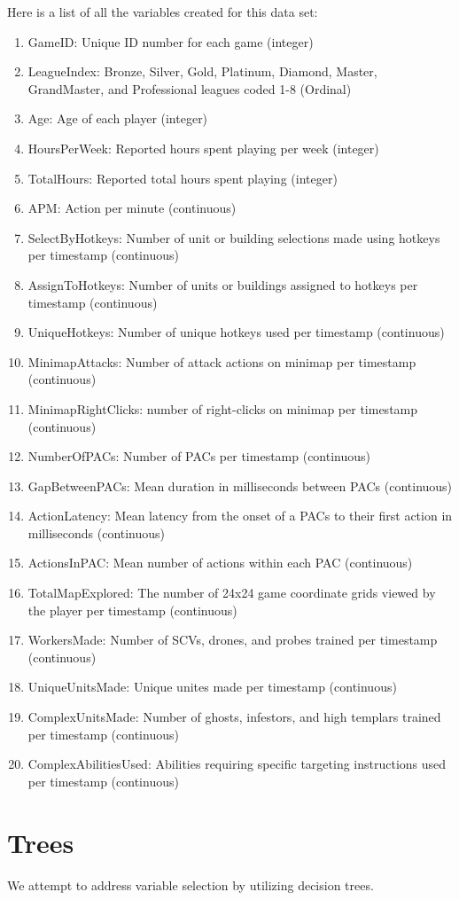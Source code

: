 \documentclass[letterpaper,10pt,english]{/usr/share/sphinx/texinputs/sphinxhowto}
\begin{document}
        
    
Here is a list of all the variables created for this data set:

\begin{enumerate}[1.]
\item
  GameID: Unique ID number for each game (integer)
\item
  LeagueIndex: Bronze, Silver, Gold, Platinum, Diamond, Master,
  GrandMaster, and Professional leagues coded 1-8 (Ordinal)
\item
  Age: Age of each player (integer)
\item
  HoursPerWeek: Reported hours spent playing per week (integer)
\item
  TotalHours: Reported total hours spent playing (integer)
\item
  APM: Action per minute (continuous)
\item
  SelectByHotkeys: Number of unit or building selections made using
  hotkeys per timestamp (continuous)
\item
  AssignToHotkeys: Number of units or buildings assigned to hotkeys per
  timestamp (continuous)
\item
  UniqueHotkeys: Number of unique hotkeys used per timestamp
  (continuous)
\item
  MinimapAttacks: Number of attack actions on minimap per timestamp
  (continuous)
\item
  MinimapRightClicks: number of right-clicks on minimap per timestamp
  (continuous)
\item
  NumberOfPACs: Number of PACs per timestamp (continuous)
\item
  GapBetweenPACs: Mean duration in milliseconds between PACs
  (continuous)
\item
  ActionLatency: Mean latency from the onset of a PACs to their first
  action in milliseconds (continuous)
\item
  ActionsInPAC: Mean number of actions within each PAC (continuous)
\item
  TotalMapExplored: The number of 24x24 game coordinate grids viewed by
  the player per timestamp (continuous)
\item
  WorkersMade: Number of SCVs, drones, and probes trained per timestamp
  (continuous)
\item
  UniqueUnitsMade: Unique unites made per timestamp (continuous)
\item
  ComplexUnitsMade: Number of ghosts, infestors, and high templars
  trained per timestamp (continuous)
\item
  ComplexAbilitiesUsed: Abilities requiring specific targeting
  instructions used per timestamp (continuous)
\end{enumerate}\part{Trees}We attempt to address variable selection by utilizing decision trees.
\end{document}
